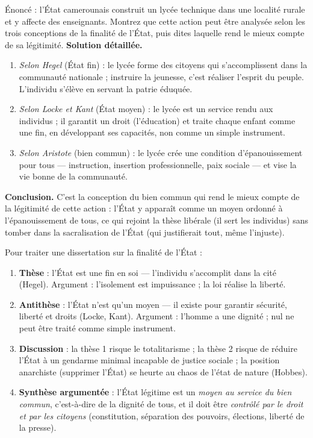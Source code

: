 \documentclass[11pt]{article}
\newcounter{popsec}
\newcounter{popsub}
\newcommand{\courssub}[1]{%
  \stepcounter{popsub}%
  \par\vspace{9pt}\noindent{\popxbold\fontsize{11.5}{13}\selectfont\color{popink}{\color{poporange}\thepopsec.\thepopsub}\hspace{6pt}#1}\par\nopagebreak\vspace{4pt}
}
\begin{document}
\begin{exoresolu}
Énoncé : l'État camerounais construit un lycée technique dans une localité rurale et y affecte des enseignants. Montrez que cette action peut être analysée selon les trois conceptions de la finalité de l'État, puis dites laquelle rend le mieux compte de sa légitimité.
\tcblower
\textbf{Solution détaillée.}
\begin{enumerate}
\item \emph{Selon Hegel} (État fin) : le lycée forme des citoyens qui s'accomplissent dans la communauté nationale ; instruire la jeunesse, c'est réaliser l'esprit du peuple. L'individu s'élève en servant la patrie éduquée.
\item \emph{Selon Locke et Kant} (État moyen) : le lycée est un service rendu aux individus ; il garantit un droit (l'éducation) et traite chaque enfant comme une fin, en développant ses capacités, non comme un simple instrument.
\item \emph{Selon Aristote} (bien commun) : le lycée crée une condition d'épanouissement pour tous — instruction, insertion professionnelle, paix sociale — et vise la \og vie bonne \fg{} de la communauté.
\end{enumerate}
\textbf{Conclusion.} C'est la conception du bien commun qui rend le mieux compte de la légitimité de cette action : l'État y apparaît comme un moyen ordonné à l'épanouissement de tous, ce qui rejoint la thèse libérale (il sert les individus) sans tomber dans la sacralisation de l'État (qui justifierait tout, même l'injuste).
\end{exoresolu}

\courssub{Bilan : vers un État légitime}

\begin{methode}
Pour traiter une dissertation sur la finalité de l'État :
\begin{enumerate}
\item \textbf{Thèse} : l'État est une fin en soi — l'individu s'accomplit dans la cité (Hegel). Argument : l'isolement est impuissance ; la loi réalise la liberté.
\item \textbf{Antithèse} : l'État n'est qu'un moyen — il existe pour garantir sécurité, liberté et droits (Locke, Kant). Argument : l'homme a une dignité ; nul ne peut être traité comme simple instrument.
\item \textbf{Discussion} : la thèse 1 risque le totalitarisme ; la thèse 2 risque de réduire l'État à un gendarme minimal incapable de justice sociale ; la position anarchiste (supprimer l'État) se heurte au chaos de l'état de nature (Hobbes).
\item \textbf{Synthèse argumentée} : l'État légitime est un \emph{moyen au service du bien commun}, c'est-à-dire de la dignité de tous, et il doit être \emph{contrôlé par le droit et par les citoyens} (constitution, séparation des pouvoirs, élections, liberté de la presse).
\end{enumerate}
\end{methode}
\end{document}
